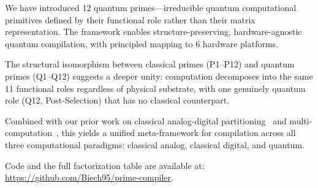 \documentclass[11pt]{article}
\begin{document}
We have introduced 12 quantum primes---irreducible quantum computational primitives defined by their functional role rather than their matrix representation. The framework enables structure-preserving, hardware-agnostic quantum compilation, with principled mapping to 6 hardware platforms.

The structural isomorphism between classical primes (P1--P12) and quantum primes (Q1--Q12) suggests a deeper unity: computation decomposes into the same 11 functional roles regardless of physical substrate, with one genuinely quantum role (Q12, Post-Selection) that has no classical counterpart.

Combined with our prior work on classical analog-digital partitioning~\cite{bieg_primes} and multi-computation~\cite{bieg_multi}, this yields a unified meta-framework for compilation across all three computational paradigms: classical analog, classical digital, and quantum.

Code and the full factorization table are available at: \url{https://github.com/Biech95/prime-compiler}.
\end{document}

